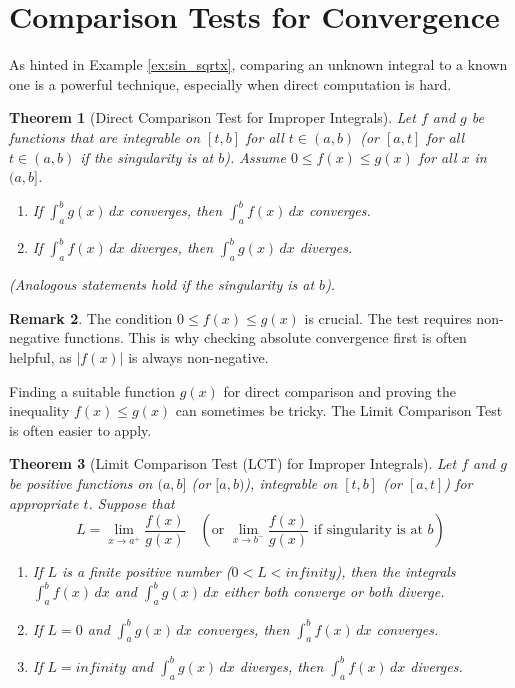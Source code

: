\documentclass[11pt]{article}
\def\infty{infinity}%
\newtheorem{theorem}{Theorem}[section]
\theoremstyle{definition}
\newtheorem{remark}[theorem]{Remark}
\newcommand{\dx}{\, dx} %
\begin{document}
\section{Comparison Tests for Convergence}

As hinted in Example \ref{ex:sin_sqrtx}, comparing an unknown integral to a known one is a powerful technique, especially when direct computation is hard.

\begin{theorem}[Direct Comparison Test for Improper Integrals]
    Let $f$ and $g$ be functions that are integrable on $[t, b]$ for all $t \in (a, b)$ (or $[a, t]$ for all $t \in (a, b)$ if the singularity is at $b$). Assume $0 \le f(x) \le g(x)$ for all $x$ in $(a, b]$.
    \begin{enumerate}
        \item If $\int_a^b g(x) \dx$ converges, then $\int_a^b f(x) \dx$ converges.
        \item If $\int_a^b f(x) \dx$ diverges, then $\int_a^b g(x) \dx$ diverges.
    \end{enumerate}
    (Analogous statements hold if the singularity is at $b$).
\end{theorem}

\begin{remark}
    The condition $0 \le f(x) \le g(x)$ is crucial. The test requires non-negative functions. This is why checking absolute convergence first is often helpful, as $|f(x)|$ is always non-negative.
\end{remark}

Finding a suitable function $g(x)$ for direct comparison and proving the inequality $f(x) \le g(x)$ can sometimes be tricky. The Limit Comparison Test is often easier to apply.

\begin{theorem}[Limit Comparison Test (LCT) for Improper Integrals]
    Let $f$ and $g$ be positive functions on $(a, b]$ (or $[a, b)$), integrable on $[t, b]$ (or $[a, t]$) for appropriate $t$. Suppose that
    \[
    L = \lim_{x \to a^+} \frac{f(x)}{g(x)} \quad (\text{or } \lim_{x \to b^-} \frac{f(x)}{g(x)} \text{ if singularity is at } b)
    \]
    \begin{enumerate}
        \item If $L$ is a finite positive number ($0 < L < \infty$), then the integrals $\int_a^b f(x) \dx$ and $\int_a^b g(x) \dx$ either both converge or both diverge.
        \item If $L = 0$ and $\int_a^b g(x) \dx$ converges, then $\int_a^b f(x) \dx$ converges.
        \item If $L = \infty$ and $\int_a^b g(x) \dx$ diverges, then $\int_a^b f(x) \dx$ diverges.
    \end{enumerate}
\end{theorem}
\end{document}
